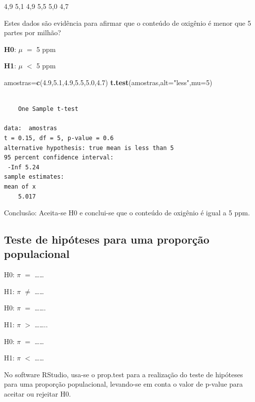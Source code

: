 \documentclass[12pt,brazil,oneside]{book}
\newenvironment{Shaded}{\begin{snugshade}}{\end{snugshade}}
\newcommand{\DataTypeTok}[1]{\textcolor[rgb]{0.13,0.29,0.53}{#1}}
\newcommand{\DecValTok}[1]{\textcolor[rgb]{0.00,0.00,0.81}{#1}}
\newcommand{\FloatTok}[1]{\textcolor[rgb]{0.00,0.00,0.81}{#1}}
\newcommand{\KeywordTok}[1]{\textcolor[rgb]{0.13,0.29,0.53}{\textbf{#1}}}
\newcommand{\NormalTok}[1]{#1}
\newcommand{\StringTok}[1]{\textcolor[rgb]{0.31,0.60,0.02}{#1}}
\begin{document}
4,9 5,1 4,9 5,5 5,0 4,7

Estes dados são evidência para afirmar que o conteúdo de oxigênio é
menor que 5 partes por milhão?

\textbf{H0}: \(\mu\) \(=\) 5 ppm

\textbf{H1}: \(\mu\) \(<\) 5 ppm

\begin{Shaded}
\begin{Highlighting}[]
\NormalTok{amostras=}\KeywordTok{c}\NormalTok{(}\FloatTok{4.9}\NormalTok{,}\FloatTok{5.1}\NormalTok{,}\FloatTok{4.9}\NormalTok{,}\FloatTok{5.5}\NormalTok{,}\FloatTok{5.0}\NormalTok{,}\FloatTok{4.7}\NormalTok{)}
\KeywordTok{t.test}\NormalTok{(amostras,}\DataTypeTok{alt=}\StringTok{"less"}\NormalTok{,}\DataTypeTok{mu=}\DecValTok{5}\NormalTok{)}
\end{Highlighting}
\end{Shaded}

\begin{verbatim}

    One Sample t-test

data:  amostras
t = 0.15, df = 5, p-value = 0.6
alternative hypothesis: true mean is less than 5
95 percent confidence interval:
 -Inf 5.24
sample estimates:
mean of x 
    5.017 
\end{verbatim}

Conclusão: Aceita-se H0 e conclui-se que o conteúdo de oxigênio é igual
a 5 ppm.

\hypertarget{teste-de-hipoteses-para-uma-proporcao-populacional}{%
\subsection{Teste de hipóteses para uma proporção
populacional}\label{teste-de-hipoteses-para-uma-proporcao-populacional}}

H0: \(\pi\) \(=\) \ldots{}\ldots{}

H1: \(\pi\) \(\neq\) \ldots{}\ldots{}

H0: \(\pi\) \(=\) \ldots{}\ldots{}.

H1: \(\pi\) \(>\) \ldots{}\ldots{}..

H0: \(\pi\) \(=\) \ldots{}\ldots{}

H1: \(\pi\) \(<\) \ldots{}\ldots{}

No software RStudio, usa-se o prop.test para a realização do teste de
hipóteses para uma proporção populacional, levando-se em conta o valor
de p-value para aceitar ou rejeitar H0.
\end{document}
